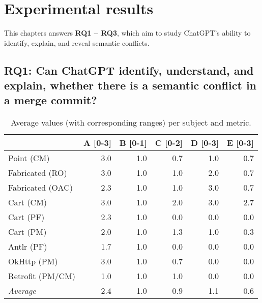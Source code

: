 \chapter{Experimental results}\label{chap:results}

This chapters answers \textbf{RQ1 -- RQ3}, which aim to study ChatGPT's ability to identify, explain, and reveal semantic conflicts. %

\section{RQ1: Can ChatGPT identify, understand, and explain, whether there is a semantic conflict in a merge commit?}\label{sec:results:rq1}


\begin{table}[t]
\centering
\begin{tabular}{@{\extracolsep{\fill}} lrrrrr} \toprule
                 & A [0-3] & B [0-1] & C [0-2] & D [0-3] & E [0-3] \\
\midrule
Point (CM)       & 3.0 & 1.0 & 0.7 & 1.0 & 0.7 \\
Fabricated (RO)  & 3.0 & 1.0 & 1.0 & 2.0 & 0.7 \\
Fabricated (OAC) & 2.3 & 1.0 & 1.0 & 3.0 & 0.7 \\
Cart (CM)        & 3.0 & 1.0 & 2.0 & 3.0 & 2.7 \\
Cart (PF)        & 2.3 & 1.0 & 0.0 & 0.0 & 0.0 \\
Cart (PM)        & 2.0 & 1.0 & 1.3 & 1.0 & 0.3 \\
Antlr (PF)       & 1.7 & 1.0 & 0.0 & 0.0 & 0.0 \\
OkHttp (PM)      & 3.0 & 1.0 & 0.7 & 0.0 & 0.0 \\
Retrofit (PM/CM) & 1.0 & 1.0 & 1.0 & 0.0 & 0.0 \\
\midrule
\textit{Average}  & 2.4 & 1.0 & 0.9 & 1.1 & 0.6 \\
\bottomrule
\end{tabular}
\caption{Average values (with corresponding ranges) per subject and metric.\label{tab:results:rq1}}
\end{table}

